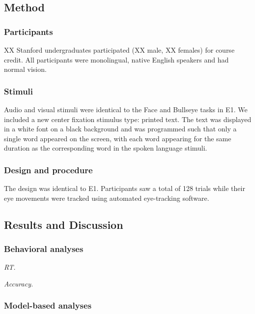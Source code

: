 \documentclass[10pt, letterpaper]{article}
\begin{document}
\subsection{Method}\label{method-1}

\subsubsection{Participants}\label{participants-1}

XX Stanford undergraduates participated (XX male, XX females) for course
credit. All participants were monolingual, native English speakers and
had normal vision.

\subsubsection{Stimuli}\label{stimuli-1}

Audio and visual stimuli were identical to the Face and Bullseye tasks
in E1. We included a new center fixation stimulus type: printed text.
The text was displayed in a white font on a black background and was
programmed such that only a single word appeared on the screen, with
each word appearing for the same duration as the corresponding word in
the spoken language stimuli.

\subsubsection{Design and procedure}\label{design-and-procedure-1}

The design was identical to E1. Participants saw a total of 128 trials
while their eye movements were tracked using automated eye-tracking
software.

\subsection{Results and Discussion}\label{results-and-discussion-1}

\subsubsection{Behavioral analyses}\label{behavioral-analyses-1}

\emph{RT.}

\emph{Accuracy.}

\subsubsection{Model-based analyses}\label{model-based-analyses-1}
\end{document}
